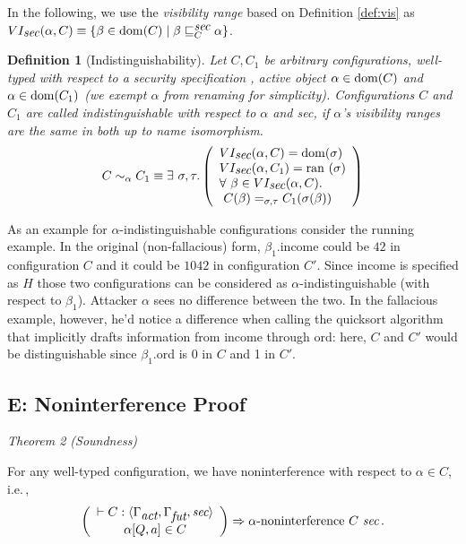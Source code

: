 \documentclass[10pt, conference, compsocconf]{IEEEtran}
\newcommand{\symb}[1]{\makebox{\it #1}}
\newcommand\dom{{\rm dom}}
\newcommand\ran{{\rm ran}\ }
\newcommand\inda{\sim_{\alpha}}
\newcommand\ie{i.e.\!\,, }
\newtheorem{definition}{Definition}[section]
\begin{document}
{In the following, we use the {\it visibility range} based on Definition \ref{def:vis} as
$VI_{\symb{sec}}(\alpha,C) \equiv \{ \beta \in \dom(C) \mid \beta \sqsubseteq_C^{{\symb{sec}}} \alpha \}$.
\begin{definition}[Indistinguishability]
Let $C, C_1$ be arbitrary configurations, well-typed with respect to a security specification \symb{sec}, 
active object $\alpha \in \dom(C)$ and $\alpha \in \dom(C_1)$ (we exempt $\alpha$ from renaming 
for simplicity).
Configurations $C$ and $C_1$ are called indistinguishable with respect to $\alpha$ and {\it sec}, 
if $\alpha$'s visibility ranges are the same in both up to name isomorphism.
\[ 
C \inda C_1 \equiv 
      \exists\ \sigma, \tau. \left( \begin{array}{l}
                VI_{\symb{sec}}(\alpha,C) = \dom(\sigma)\\
                VI_{\symb{sec}}(\alpha, C_1) = \ran(\sigma)\\ 
                \forall\ \beta \in VI_{\symb{sec}}(\alpha,C). \\ \ C(\beta) =_{\sigma,\tau} C_1(\sigma(\beta))
         \end{array}\right)
\]
\end{definition}

As an example for $\alpha$-indistinguishable configurations consider the running example.
In the original (non-fallacious) form, $\beta_1$.income could be $42$ in configuration $C$
and it could be $1042$ in configuration $C'$. Since income is specified as $H$ those two configurations
can be considered as $\alpha$-indistinguishable (with respect to $\beta_1$). 
Attacker $\alpha$ sees no difference between the two. In the fallacious example, however, he'd notice a difference
when calling the quicksort algorithm that implicitly drafts information from income through ord:
here, $C$ and $C'$ would be distinguishable since $\beta_1$.ord is 0 in $C$ and 1 in $C'$.



\subsection*{E: Noninterference Proof}
\it Theorem 2 (Soundness)}
For any well-typed configuration, 
we have noninterference with respect to $\alpha \in C$, \ie
\[ 
\left(
\begin{array}{c}
\vdash C: \langle \Gamma_{\symb{act}}, \Gamma_{\symb{fut}},  \symb{sec}\rangle \\
 \alpha[Q,a] \in C 
\end{array}\right)
\Rightarrow 
 \alpha{\mbox{\rm {-noninterference}}}\ C\ \symb{sec} \,.
\]
\end{document}
